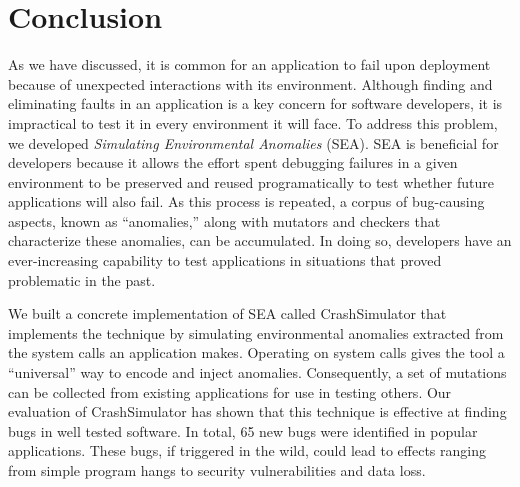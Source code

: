 \section{Conclusion}
\label{SEC:conclusion}

As we have discussed,
it is common for an application
to fail upon deployment because of unexpected interactions
with its environment.
Although finding and eliminating
faults in an application is a key concern for software developers, it is
impractical to test it in every environment it will face.
To address this problem, we developed \textit{Simulating Environmental
Anomalies} (SEA).
SEA is beneficial for developers because it allows
the effort spent debugging failures in a given environment
to be preserved and reused programatically to test whether
future applications will also fail.
As this process is repeated,
a corpus of bug-causing aspects,
known as ``anomalies,''
along with mutators and checkers that characterize these anomalies,
can be accumulated. In doing so, developers have an ever-increasing capability
to test applications in situations
that proved problematic in the past.

We built a concrete implementation of SEA
called CrashSimulator that implements
the technique by simulating environmental
anomalies extracted from the system calls an application makes.
Operating on system calls gives the tool a ``universal'' way to
encode and inject anomalies. Consequently, a set of mutations can be
collected from existing applications for use in testing others.
Our evaluation of CrashSimulator
has shown that this technique is
effective at finding bugs in well tested software.
In total,
65 new bugs were identified in popular applications.
These bugs, if triggered in the wild,
could lead to effects ranging from simple program hangs
to security vulnerabilities and data loss.

%